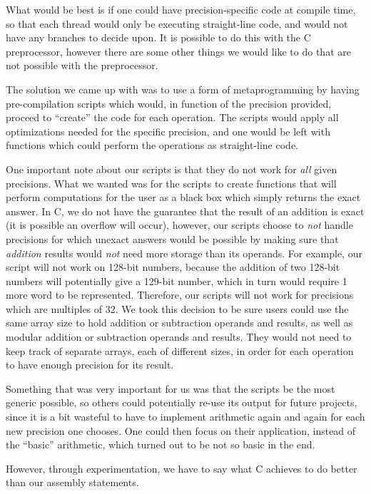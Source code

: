 \documentclass[10pt, a4paper]{report}
\begin{document}
What would be best is if one could have precision-specific code at compile time,
so that each thread would only be executing straight-line code, and would not
have any branches to decide upon.
It is possible to do this with the C preprocessor, however there are some
other things we would like to do that are not possible with the preprocessor.

The solution we came up with was to use a form of metaprogramming by having
pre-compilation scripts which would, in function of the precision provided,
proceed to ``create'' the code for each operation.
The scripts would apply all optimizations needed for the specific precision, and
one would be left with functions which could perform the operations as
straight-line code.

One important note about our scripts is that they do not work for \emph{all}
given precisions.
What we wanted was for the scripts to create functions that will perform
computations for the user as a black box which simply returns the exact answer.
In C, we do not have the guarantee that the result of an addition is exact (it
is possible an overflow will occur), however, our scripts choose to \emph{not}
handle precisions for which unexact answers would be possible by making sure
that \emph{addition} results would \emph{not} need more storage than its
operands.
For example, our script will not work on 128-bit numbers, because the addition
of two 128-bit numbers will potentially give a 129-bit number, which in turn
would require 1 more word to be represented.
Therefore, our scripts will not work for precisions which are multiples of 32.
We took this decision to be sure users could use the same array size to hold
addition or subtraction operands and results, as well as modular addition or
subtraction operands and results.
They would not need to keep track of separate arrays, each of different sizes,
in order for each operation to have enough precision for its result.

Something that was very important for us was that the scripts be the most
generic possible, so others could potentially re-use its output for future
projects, since it is a bit wasteful to have to implement arithmetic again and
again for each new precision one chooses.
One could then focus on their application, instead of the ``basic'' arithmetic,
which turned out to be not so basic in the end.

However, through experimentation, we have to say what C achieves to do better
than our assembly statements.
\end{document}

